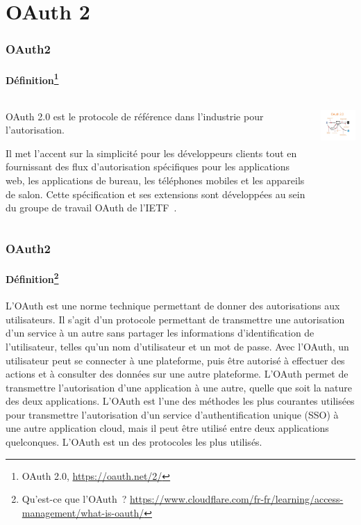 \documentclass{beamer}
\begin{document}
    \section{OAuth 2}\label{sec:oauth-2}
    \begin{frame}
        \frametitle{OAuth2}
        \framesubtitle{Définition\footnote{OAuth 2.0, \url{https://oauth.net/2/}}}
        \transdissolve
        \begin{columns}
            \begin{column}{0.6\textwidth}
                OAuth 2.0 est le protocole de référence dans l'industrie pour l'autorisation.

                Il met l'accent sur la simplicité pour les développeurs clients tout en fournissant des flux d'autorisation spécifiques pour les applications web, les applications de bureau, les téléphones mobiles et les appareils de salon.
                Cette spécification et ses extensions sont développées au sein du groupe de travail OAuth de l'IETF~.
            \end{column}
            \begin{column}{0.4\textwidth}
                \centering
                \includegraphics[width=6cm]{image/oauth2-flow}
            \end{column}
        \end{columns}
    \end{frame}

    \begin{frame}
        \frametitle{OAuth2}
        \framesubtitle{Définition\footnote{Qu'est-ce que l'OAuth~? \url{https://www.cloudflare.com/fr-fr/learning/access-management/what-is-oauth/}}}
        \transdissolve
        L'OAuth est une norme technique permettant de donner des autorisations aux utilisateurs.
        Il s'agit d'un protocole permettant de transmettre une autorisation d'un service à un autre sans partager les informations d'identification de l'utilisateur, telles qu'un nom d'utilisateur et un mot de passe.
        Avec l'OAuth, un utilisateur peut se connecter à une plateforme, puis être autorisé à effectuer des actions et à consulter des données sur une autre plateforme.
        \bigbreak
        L'OAuth permet de transmettre l'autorisation d'une application à une autre, quelle que soit la nature des deux applications.
        L'OAuth est l'une des méthodes les plus courantes utilisées pour transmettre l'autorisation d'un service d'authentification unique (SSO) à une autre application cloud, mais il peut être utilisé entre deux applications quelconques.
        L'OAuth est un des protocoles les plus utilisés.
    \end{frame}
\end{document}
